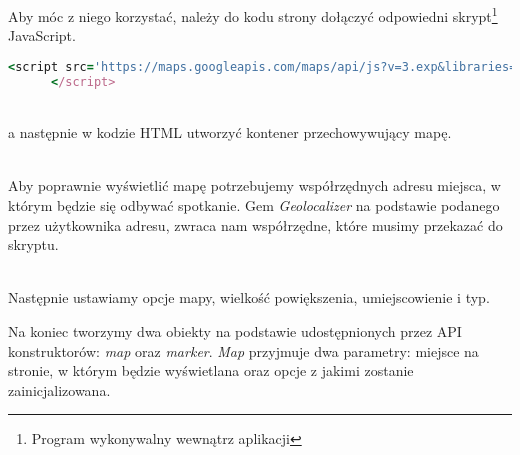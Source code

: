 Aby móc z niego korzystać, należy do kodu strony dołączyć odpowiedni skrypt\footnote{Program wykonywalny wewnątrz aplikacji} JavaScript.
\begin{code}
  \begin{lstlisting}[language=Ruby, basicstyle=\ttfamily\scriptsize, showstringspaces=false]
      <script src='https://maps.googleapis.com/maps/api/js?v=3.exp&libraries=places'>
      </script>
  \end{lstlisting}
\end{code}\\

a następnie w kodzie HTML utworzyć kontener przechowywujący mapę.
\begin{code}
  
\end{code}\\

Aby poprawnie wyświetlić mapę potrzebujemy współrzędnych adresu miejsca, w którym będzie się odbywać spotkanie. Gem \emph{Geolocalizer} na podstawie podanego przez użytkownika adresu, zwraca nam współrzędne, które musimy przekazać do skryptu.

\begin{code}
  
\end{code}\\

Następnie ustawiamy opcje mapy, wielkość powiększenia, umiejscowienie i typ.

Na koniec tworzymy dwa obiekty na podstawie udostępnionych przez API konstruktorów: \emph{map} oraz \emph{marker}. \emph{Map} przyjmuje dwa parametry: miejsce na stronie, w którym będzie wyświetlana oraz opcje z jakimi zostanie zainicjalizowana.
